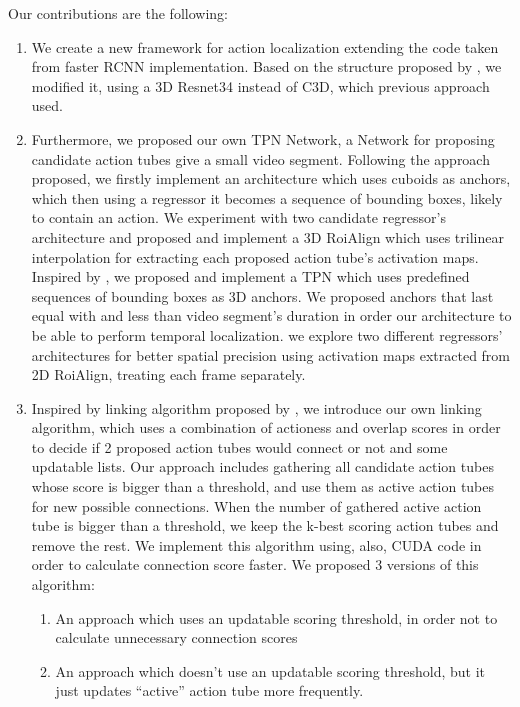 Our contributions are the following:
\begin{enumerate}
\item We create a new framework for action localization extending the code taken from faster RCNN implementation. Based on the structure
  proposed by \cite{DBLP:journals/corr/HouCS17}, we modified it, using a 3D Resnet34 instead of C3D, which previous approach used.

\item Furthermore, we proposed our own TPN Network, a Network for proposing candidate action tubes give a small video segment.
  Following the approach \cite{DBLP:journals/corr/HouCS17} proposed, we firstly implement an architecture which uses
  cuboids as anchors, which then using a regressor it becomes a sequence of bounding boxes, likely to contain an action.
  We experiment with two candidate regressor's architecture and proposed and implement a 3D RoiAlign which uses trilinear
  interpolation for extracting each proposed action tube's activation maps. 
  Inspired by \cite{DBLP:journals/corr/abs-1712-09184}, we proposed and implement a TPN which uses predefined sequences of bounding
  boxes as 3D anchors. We proposed anchors that last equal with and less than video segment's duration in order our architecture to be able to
  perform temporal localization.  we explore two different regressors' architectures for better spatial precision using activation
  maps extracted from 2D RoiAlign, treating each frame separately.
\item Inspired by linking algorithm proposed by \cite{DBLP:journals/corr/HouCS17}, we introduce our own linking algorithm, which
  uses a combination of actioness and overlap scores in order to decide if 2 proposed action tubes would connect or not and some updatable lists.
  Our approach includes gathering all candidate action tubes whose score is bigger than a threshold, and use them as active action tubes for
  new possible connections. When the number of gathered active action tube is bigger than a threshold, we keep the k-best scoring action tubes
  and remove the rest.  We implement this algorithm using, also, CUDA code in order to calculate connection score faster. We proposed 3 versions of this algorithm:
  \begin{enumerate}
  \item An approach which uses an updatable scoring threshold, in order not to calculate unnecessary connection scores
  \item An approach which doesn't use an updatable scoring threshold, but it just updates ``active'' action tube more frequently.

\end{enumerate}
\end{enumerate}
